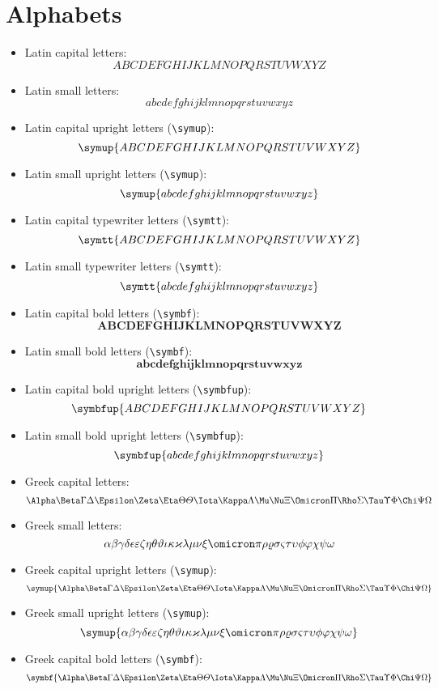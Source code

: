 \documentclass{article}
\def\Latinalphabets{ABCDEFGHIJKLMNOPQRSTUVWXYZ}
\def\latinalphabets{abcdefghijklmnopqrstuvwxyz}
\def\Greekalphabets{%
  \Alpha      \Beta       \Gamma      \Delta      \Epsilon
  \Zeta       \Eta        \Theta      \varTheta   \Iota
  \Kappa      \Lambda     \Mu         \Nu         \Xi
  \Omicron    \Pi         \Rho        \Sigma      \Tau
  \Upsilon    \Phi        \Chi        \Psi        \Omega
}
\def\greekalphabets{%
  \alpha      \beta       \gamma      \delta      \epsilon
  \varepsilon \zeta       \eta        \theta      \vartheta 
  \iota       \kappa      \varkappa   \lambda     \mu
  \nu         \xi         \omicron    \pi         \rho
  \varrho     \sigma      \varsigma   \tau        \upsilon
  \phi        \varphi     \chi        \psi        \omega
}
\begin{document}
\section{Alphabets}

\begin{itemize}
  \item Latin capital letters:
        \[ \Latinalphabets \]

  \item Latin small letters:
        \[ \latinalphabets \]

  \item Latin capital upright letters (\verb|\symup|):
        \[ \symup{\Latinalphabets} \]

  \item Latin small upright letters (\verb|\symup|):
        \[ \symup{\latinalphabets} \]

  \item Latin capital typewriter letters (\verb|\symtt|):
        \[ \symtt{\Latinalphabets} \]

  \item Latin small typewriter letters (\verb|\symtt|):
        \[ \symtt{\latinalphabets} \]

  \item Latin capital bold letters (\verb|\symbf|):
        \[ \symbf{\Latinalphabets} \]

  \item Latin small bold letters (\verb|\symbf|):
        \[ \symbf{\latinalphabets} \]

  \item Latin capital bold upright letters (\verb|\symbfup|):
        \[ \symbfup{\Latinalphabets} \]

  \item Latin small bold upright letters (\verb|\symbfup|):
        \[ \symbfup{\latinalphabets} \]

  \item Greek capital letters:
        \[ \Greekalphabets \]

  \item Greek small letters:
        \[ \greekalphabets \]

  \item Greek capital upright letters (\verb|\symup|):
        \[ \symup{\Greekalphabets} \]

  \item Greek small upright letters (\verb|\symup|):
        \[ \symup{\greekalphabets} \]

  \item Greek capital bold letters (\verb|\symbf|):
        \[ \symbf{\Greekalphabets} \]


\end{itemize}
\end{document}
